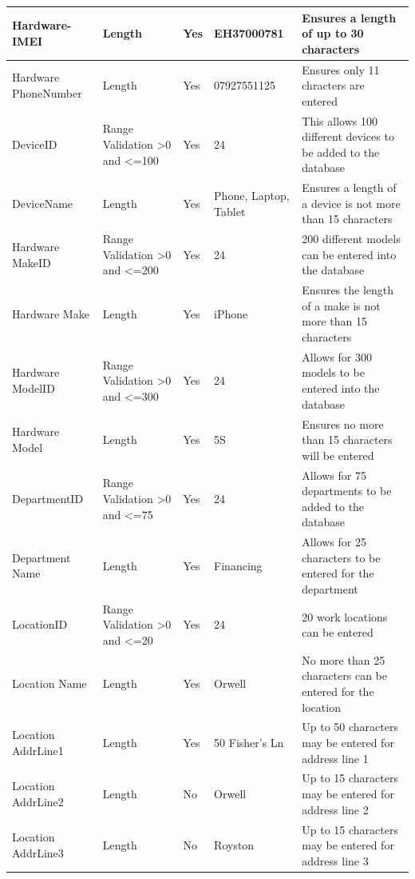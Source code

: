 \begin{center}
\begin{longtable}{|p{2.5cm}|p{2cm}|p{3cm}|p{3cm}|p{3cm}|}
Hardware-IMEI               & Length              &Yes                     & EH37000781               & Ensures a length of up to 30 characters                      \\ \hline
Hardware PhoneNumber                  & Length            &Yes                      & 07927551125              &   Ensures only 11 chracters are entered                      \\ \hline
DeviceID                     & Range Validation \textgreater0 and \textless=100            &Yes                       & 24                 & This allows 100 different devices to be added to the database                    \\ \hline
DeviceName                         & Length                       &Yes            & Phone, Laptop, Tablet                &  Ensures a length of a device is not more than 15 characters                     \\ \hline
Hardware MakeID                    & Range Validation \textgreater0 and \textless=200      &Yes                             & 24                 & 200 different models can be entered into the database                       \\ \hline
Hardware Make                        & Length               &Yes                    & iPhone                & Ensures the length of a make is not more than 15 characters                      \\ \hline
Hardware ModelID		& Range Validation \textgreater0 and \textless=300                      &Yes             & 24                 & Allows for 300 models to be entered into the database                        \\ \hline
Hardware Model                      & Length            &Yes                       & 5S                    & Ensures no more than 15 characters will be entered                       \\ \hline
DepartmentID 	&Range Validation \textgreater0 and \textless=75	&Yes	& 24		& Allows for 75 departments to be added to the database	\\ \hline
Department Name	& Length	&Yes	& Financing		& Allows for 25 characters to be entered for the department	\\ \hline
LocationID 		&Range Validation \textgreater0 and \textless=20	&Yes	& 	24	& 20 work locations can be entered		\\ \hline
Location Name	& Length	&Yes	&	Orwell	 & No more than 25 characters can be entered for the location  \\ \hline
Location AddrLine1 & Length	&Yes	&	50 Fisher's Ln	 & Up to 50 characters may be entered for address line 1  \\ \hline
Location AddrLine2 & Length	&No	&	Orwell	 & Up to 15 characters may be entered for address line 2 \\ \hline
Location AddrLine3  & Length	&No	&	Royston 	 &Up to 15 characters may be entered for address line 3  \\ \hline
    \end{longtable}
\end{center}

